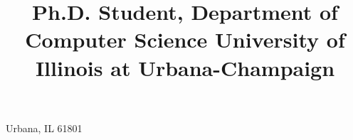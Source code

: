
\usepackage[margin=0.75in]{geometry}

\makeatletter %
\makeatother  %



\setlength{\hintscolumnwidth}{2.2cm}


\title{
    Ph.D. Student, Department of Computer Science \texorpdfstring{\newline}{}
    University of Illinois at Urbana-Champaign
}

\address{1010 W Springfield Ave, Apt 306}{Urbana, IL 61801}


\usepackage{multibib} %


\makeatletter %
\renewcommand*\bibliographyitemlabel{\@biblabel{\arabic{enumiv}}}
\makeatother  %

